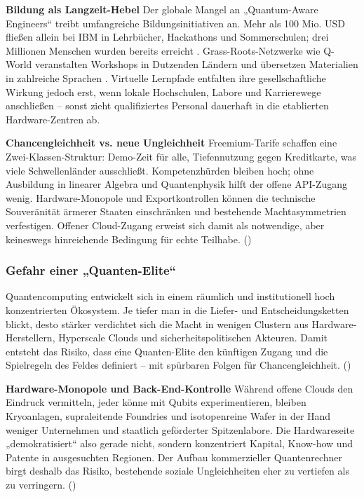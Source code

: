 {\textbf{Bildung als Langzeit-Hebel}
Der globale Mangel an „Quantum-Aware Engineers“ treibt umfangreiche Bildungsinitiativen an. Mehr als 100 Mio. USD fließen allein bei IBM in Lehrbücher, Hackathons und Sommerschulen; drei Millionen Menschen wurden bereits erreicht . Grass-Roots-Netzwerke wie Q-World veranstalten Workshops in Dutzenden Ländern und übersetzen Materialien in zahlreiche Sprachen .
Virtuelle Lernpfade entfalten ihre gesellschaftliche Wirkung jedoch erst, wenn lokale Hochschulen, Labore und Karrierewege anschließen – sonst zieht qualifiziertes Personal dauerhaft in die etablierten Hardware-Zentren ab.\cite{seskirDemocratizationQuantumTechnologies2022}

\textbf{Chancengleichheit vs. neue Ungleichheit}
Freemium-Tarife schaffen eine Zwei-Klassen-Struktur: Demo-Zeit für alle, Tiefennutzung gegen Kreditkarte, was viele Schwellenländer ausschließt.
Kompetenzhürden bleiben hoch; ohne Ausbildung in linearer Algebra und Quantenphysik hilft der offene API-Zugang wenig.
Hardware-Monopole und Exportkontrollen können die technische Souveränität ärmerer Staaten einschränken und bestehende Machtasymmetrien verfestigen.
Offener Cloud-Zugang erweist sich damit als notwendige, aber keineswegs hinreichende Bedingung für echte Teilhabe. (\cite{seskirDemocratizationQuantumTechnologies2022})

\subsubsection{Gefahr einer „Quanten-Elite“}
Quantencomputing entwickelt sich in einem räumlich und institutionell hoch konzentrierten Ökosystem. Je tiefer man in die Liefer- und Entscheidungsketten blickt, desto stärker verdichtet sich die Macht in wenigen Clustern aus Hardware-Herstellern, Hyperscale Clouds und sicherheitspolitischen Akteuren. Damit entsteht das Risiko, dass eine Quanten-Elite den künftigen Zugang und die Spielregeln des Feldes definiert – mit spürbaren Folgen für Chancengleichheit. (\cite{seskirDemocratizationQuantumTechnologies2022})

\textbf{Hardware-Monopole und Back-End-Kontrolle}
Während offene Clouds den Eindruck vermitteln, jeder könne mit Qubits experimentieren, bleiben Kryoanlagen, supraleitende Foundries und isotopenreine Wafer in der Hand weniger Unternehmen und staatlich geförderter Spitzenlabore. Die Hardwareseite „demokratisiert“ also gerade nicht, sondern konzentriert Kapital, Know-how und Patente in ausgesuchten Regionen. Der Aufbau kommerzieller Quantenrechner birgt deshalb das Risiko, bestehende soziale Ungleichheiten eher zu vertiefen als zu verringern. (\cite{seskirDemocratizationQuantumTechnologies2022})

}
